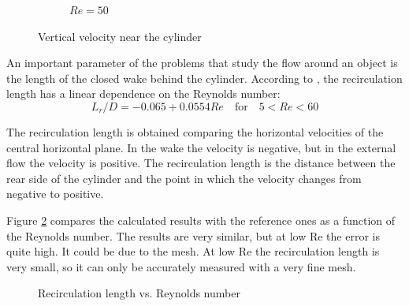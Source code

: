 \begin{figure}[H]
\begin{subfigure}{0.5\textwidth}
		\caption{$Re=50$}
	\end{subfigure}
	\caption{Vertical velocity near the cylinder}
	\label{StreamlinesCylinder}
\end{figure}

\pagebreak
An important parameter of the problems that study the flow around an object is the length of the closed wake behind the cylinder. According to \cite{Breuer2000}, the recirculation length has a linear dependence on the Reynolds number:
\begin{equation}
L_{r}/D=-0.065+0.0554Re \quad \textrm{for} \quad 5<Re<60
\end{equation}

The recirculation length is obtained comparing the horizontal velocities of the central horizontal plane. In the wake the velocity is negative, but in the external flow the velocity is positive. The recirculation length is the distance between the rear side of the cylinder and the point in which the velocity changes from negative to positive.

Figure \ref{RecirculationReynolds} compares the calculated results with the reference ones as a function of the Reynolds number. The results are very similar, but at low Re the error is quite high. It could be due to the mesh. At low Re the recirculation length is very small, so it can only be accurately measured with a very fine mesh.
\begin{figure}[H]
	\centering
	
	\caption{Recirculation length vs. Reynolds number}
	\label{RecirculationReynolds}
\end{figure}